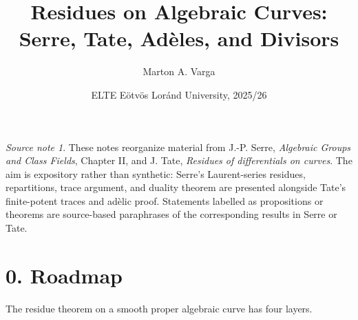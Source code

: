 \documentclass[11pt,a4paper]{article}
\title{\sffamily Residues on Algebraic Curves:\\ Serre, Tate, Adèles, and Divisors}
\author{Marton A. Varga}
\date{ELTE E\"otv\"os Lor\'and University, 2025/26}
\theoremstyle{definition}
\theoremstyle{plain}
\theoremstyle{remark}
\newtheorem*{source}{Source note}
\begin{document}
\maketitle

\begin{source}
These notes reorganize material from J.-P. Serre, \emph{Algebraic Groups and Class Fields}, Chapter II, and J. Tate, \emph{Residues of differentials on curves}.  The aim is expository rather than synthetic: Serre's Laurent-series residues, repartitions, trace argument, and duality theorem are presented alongside Tate's finite-potent traces and adèlic proof.  Statements labelled as propositions or theorems are source-based paraphrases of the corresponding results in Serre or Tate.
\end{source}

\tableofcontents
\newpage

\section*{0. Roadmap}

The residue theorem on a smooth proper algebraic curve has four layers.
\end{document}
